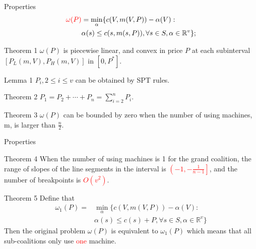 \documentclass[14pt]{beamer}
\begin{document}
\begin{frame}{Properties}
	\vspace{-10mm}
	\small
		\begin{eqnarray*}
		\textcolor{red}{\omega(P)} & =\mathop{\min}_{\alpha}\{c(V,m(V,P))-\alpha(V): \\
		 &\alpha(s)\leq c(s,m(s,P)),\forall s \in S, \alpha\in\mathbb{R}^{v}\};
		\end{eqnarray*}
		\vspace{-10mm}
		\footnotesize
		\begin{block}{Theorem 1}
		${\omega(P)}$ is piecewise linear, and convex in price $P$ at each subinterval $[P_L(m,V),P_H(m,V)]$ in $[0,P^*]$.
		\end{block}

		\begin{block}{Lemma 1}
		$P_i, 2 \leq i \leq v$ can be obtained by SPT rules.
		\end{block}

		\begin{block}{Theorem 2}
		$P_{1}=P_{2}+\cdots+P_{n}=\sum_{i=2}^n P_i$.
		\end{block}

		\begin{block}{Theorem 3}
		$\omega(P)$ can be bounded by zero when the number of using machines, m, is larger than $\frac{n}{2}$.
		\end{block}

\end{frame}


\begin{frame}{Properties}
	\vspace{-1mm}
	\small
		\begin{block}{Theorem 4}
			When the number of using machines is 1 for the grand coalition, the range of slopes of the line segments in the interval is \textcolor{red}{$\left( -1 , -\frac{1}{n-1} \right]$}, and the number of breakpoints is \textcolor{red}{$ O(v^2)$}.
		\end{block}

		\begin{block}{Theorem 5}
			Define that
			\begin{eqnarray*}
			{\omega_1(P)}=&\mathop{\min}_{\alpha}\{c(V,m(V,P))-\alpha(V): \\
			&\alpha(s)\leq c(s)+P,\forall s \in S, \alpha\in\mathbb{R}^{v}\}
			\end{eqnarray*}
			Then the original problem $\omega(P)$ is equivalent to $\omega_1(P)$ which means that all sub-coalitions only use \textcolor{red}{one} machine.
		\end{block}

\end{frame}
\end{document}

